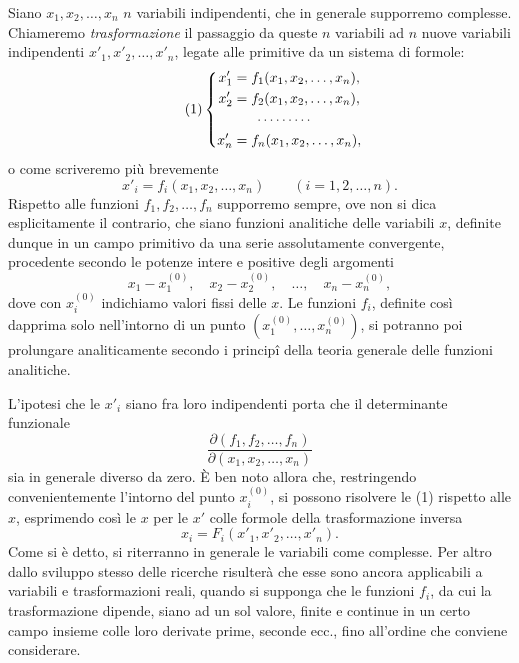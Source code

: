 \documentclass[11pt]{book}
\begin{document}
Siano $x_1,x_2,\ldots,x_n$ $n$ variabili indipendenti, che in generale supporremo complesse. Chiameremo \emph{trasformazione} il passaggio da queste $n$ variabili ad $n$ nuove variabili indipendenti $x'_1,x'_2,\ldots,x'_n$, legate alle primitive da un sistema di formole:
\begin{equation*}\tag{1}
\left\{
\begin{aligned}
 x'_1&=f_1(x_1,x_2,\ldots,x_n),\\
 x'_2&=f_2(x_1,x_2,\ldots,x_n),\\
 &\hspace{1.6em}\cdots\cdots\cdots\\
 x'_n&=f_n(x_1,x_2,\ldots,x_n),
\end{aligned}
\right.
\end{equation*}
o come scriveremo più brevemente
\begin{equation*}\tag{$1^*$}
 x'_i=f_i(x_1,x_2,\ldots,x_n)\qquad (i=1,2,\ldots,n).
\end{equation*}
Rispetto alle funzioni $f_1,f_2,\ldots,f_n$ supporremo sempre, ove non si dica esplicitamente il contrario, che siano funzioni analitiche delle variabili $x$, definite dunque in un campo primitivo da una serie assolutamente convergente, procedente secondo le potenze intere e positive degli argomenti
\[
 x_1-x_1^{(0)},\quad x_2-x_2^{(0)},\quad \ldots,\quad x_n-x_n^{(0)},
\]
dove con $x_i^{(0)}$ indichiamo valori fissi delle $x$. Le funzioni $f_i$, definite così dapprima solo nell'intorno di un punto $(x_1^{(0)},\ldots,x_n^{(0)})$, si potranno poi prolungare analiticamente secondo i principî della teoria generale delle funzioni analitiche.

L'ipotesi che le $x'_i$ siano fra loro indipendenti porta che il determinante funzionale
\[
 \frac{\partial(f_1,f_2,\ldots,f_n)}{\partial(x_1,x_2,\ldots,x_n)}
\]
sia in generale diverso da zero. È ben noto allora che, restringendo convenientemente l'intorno del punto $x_i^{(0)}$, si possono risolvere le (1) rispetto alle $x$, esprimendo così le $x$ per le $x'$ colle formole della trasformazione inversa
\begin{equation*}\tag{2}
 x_i=F_i(x'_1,x'_2,\ldots,x'_n).
\end{equation*}
Come si è detto, si riterranno in generale le variabili come complesse. Per altro dallo sviluppo stesso delle ricerche risulterà che esse sono ancora applicabili a variabili e trasformazioni reali, quando si supponga che le funzioni $f_i$, da cui la trasformazione dipende, siano ad un sol valore, finite e continue in un certo campo insieme colle loro derivate prime, seconde ecc., fino all'ordine che conviene considerare.
\end{document}
